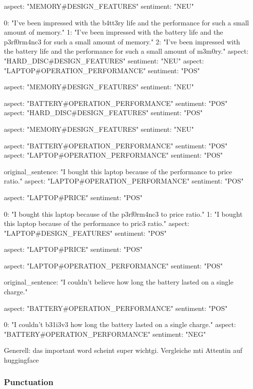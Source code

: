     aspect: "MEMORY#DESIGN_FEATURES"
    sentiment: "NEU"

0: "I've been impressed with the b4tt3ry life and the performance for such a small amount of memory."
1: "I've been impressed with the battery life and the p3rf0rm4nc3 for such a small amount of memory."
2: "I've been impressed with the battery life and the performance for such a small amount of m3m0ry."
aspect: "HARD_DISC#DESIGN_FEATURES"
sentiment: "NEU"
aspect: "LAPTOP#OPERATION_PERFORMANCE"
sentiment: "POS"

    aspect: "MEMORY#DESIGN_FEATURES"
    sentiment: "NEU"

aspect: "BATTERY#OPERATION_PERFORMANCE"
sentiment: "POS"
aspect: "HARD_DISC#DESIGN_FEATURES"
sentiment: "POS"

    aspect: "MEMORY#DESIGN_FEATURES"
    sentiment: "NEU"

aspect: "BATTERY#OPERATION_PERFORMANCE"
sentiment: "POS"
aspect: "LAPTOP#OPERATION_PERFORMANCE"
sentiment: "POS"


original_sentence: "I bought this laptop because of the performance to price ratio."
aspect: "LAPTOP#OPERATION_PERFORMANCE"
sentiment: "POS"

    aspect: "LAPTOP#PRICE"
    sentiment: "POS"

0: "I bought this laptop because of the p3rf0rm4nc3 to price ratio."
1: "I bought this laptop because of the performance to pric3 ratio."
aspect: "LAPTOP#DESIGN_FEATURES"
sentiment: "POS"

    aspect: "LAPTOP#PRICE"
    sentiment: "POS"

aspect: "LAPTOP#OPERATION_PERFORMANCE"
sentiment: "POS"


original_sentence: "I couldn't believe how long the battery lasted on a single charge."

    aspect: "BATTERY#OPERATION_PERFORMANCE"
    sentiment: "POS"

0: "I couldn't b31i3v3 how long the battery lasted on a single charge."
aspect: "BATTERY#OPERATION_PERFORMANCE"
sentiment: "NEG"


Generell: das important word scheint super wichtgi. Vergleiche mti Attentin auf huggingface


\subsubsection{Punctuation}


